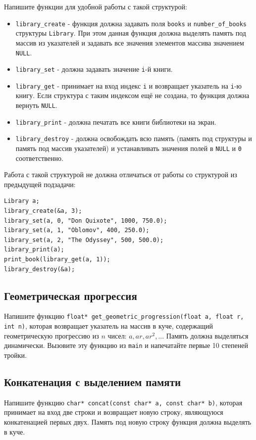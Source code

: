 \documentclass[10pt]{article}
\begin{document}
\begin{enumerate}
Напишите функции для удобной работы с такой структурой:
\begin{itemize}
\item \texttt{library\_create} - функция должна задавать поля \texttt{books} и \texttt{number\_of\_books} структуры \texttt{Library}. При этом данная функция должна выделять память под массив из указателей и задавать все значения элементов массива значением \texttt{NULL}.
\item \texttt{library\_set} - должна задавать значение \texttt{i}-й книги.
\item \texttt{library\_get} - принимает на вход индекс \texttt{i} и возвращает указатель на \texttt{i}-ю книгу. Если структура с таким индексом ещё не создана, то функция должна вернуть \texttt{NULL}.
\item \texttt{library\_print} - должна печатать все книги библиотеки на экран.
\item \texttt{library\_destroy} - должна освобождать всю память (память под структуры и память под массив указателей) и устанавливать значения полей в \texttt{NULL} и \texttt{0} соответственно.
\end{itemize}

Работа с такой структурой не должна отличаться от работы со структурой из предыдущей подзадачи:
\begin{lstlisting}
Library a;
library_create(&a, 3);
library_set(a, 0, "Don Quixote", 1000, 750.0);
library_set(a, 1, "Oblomov", 400, 250.0);
library_set(a, 2, "The Odyssey", 500, 500.0);
library_print(a);
print_book(library_get(a, 1));
library_destroy(&a);
\end{lstlisting}
\fi
\end{enumerate}




\subsection{Геометрическая прогрессия}
Напишите функцию \texttt{float* get\_geometric\_progression(float a, float r, int n)}, которая возвращает указатель на массив в куче, содержащий геометрическую прогрессию из $n$ чисел: 
$a, ar, ar^2, ...$ 
Память должна выделяться динамически. Вызовите эту функцию из \texttt{main} и напечатайте первые 10 степеней тройки.

\subsection{Конкатенация с выделением памяти}
Напишите функцию \texttt{char* concat(const char* a, const char* b)}, которая принимает на вход две строки и возвращает новую строку, являющуюся конкатенацией первых двух. Память под новую строку функция должна выделять в куче.
\end{document}
